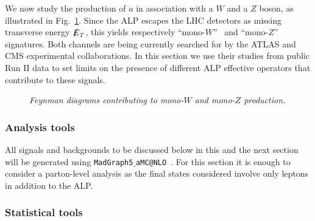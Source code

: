 \documentclass[11pt]{article}
\newcommand{\ETmiss}{\slashed{E}_T}
\renewcommand{\[}{\begin{equation}}
\renewcommand{\]}{\end{equation}}
\newcounter{diagram}
\begin{document}
We now study the production of $a$ in association with a $W$ and a $Z$ boson, as illustrated in Fig.~\ref{diagram_monoWZ}. Since the ALP escapes the LHC 
detectors as missing transverse energy $\ETmiss$, this yields respectively 
 ``mono-$W$''~\cite{Bai:2012xg} and  ``mono-$Z$''~\cite{Bell:2012rg,Carpenter:2012rg,Alves:2015dya,No:2015xqa,Neubert:2015fka} signatures. 
 Both channels are being currently searched for by the ATLAS and CMS experimental collaborations. In this 
 section we use their studies from public Run II data to set limits on the presence of different ALP effective operators that contribute to 
 these signals. 
 \begin{figure}[t]\centering

\caption{  \it \small Feynman diagrams contributing to mono-$W$ and mono-$Z$ production.}\label{diagram_monoWZ}
\vspace{2mm}
\end{figure}

 \vspace{-0.2cm} 

\subsubsection*{Analysis tools}

 \vspace{-0.2cm}
 
All signals and backgrounds to be discussed below in this and the next section will be generated using  {\tt MadGraph5$\_$aMC@NLO}~\cite{Alwall:2014hca}. 
For this section it is enough to consider a parton-level analysis as the final states considered involve only leptons in addition to the ALP.
 
 \vspace{-0.2cm} 
 
\subsubsection*{Statistical tools}

 \vspace{-0.2cm} 
 
\end{document}
